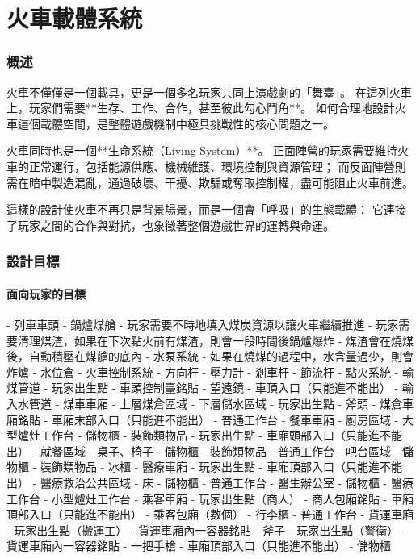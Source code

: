 \section{火車載體系統}
\subsubsection{概述}
火車不僅僅是一個載具，更是一個多名玩家共同上演戲劇的「舞臺」。
在這列火車上，玩家們需要**生存、工作、合作，甚至彼此勾心鬥角**。
如何合理地設計火車這個載體空間，是整體遊戲機制中極具挑戰性的核心問題之一。

火車同時也是一個**生命系統（Living System）**。
正面陣營的玩家需要維持火車的正常運行，包括能源供應、機械維護、環境控制與資源管理；
而反面陣營則需在暗中製造混亂，通過破壞、干擾、欺騙或奪取控制權，盡可能阻止火車前進。

這樣的設計使火車不再只是背景場景，而是一個會「呼吸」的生態載體：
它連接了玩家之間的合作與對抗，也象徵著整個遊戲世界的運轉與命運。

\subsubsection{設計目標}
\paragraph{\Large\bfseries 面向玩家的目標}
\begin{markdown}
- 列車車頭
    - 鍋爐煤艙
        - 玩家需要不時地填入煤炭資源以讓火車繼續推進
        - 玩家需要清理煤渣，如果在下次點火前有煤渣，則會一段時間後鍋爐爆炸
        - 煤渣會在燒煤後，自動積壓在煤艙的底內
    - 水泵系統
        - 如果在燒煤的過程中，水含量過少，則會炸爐
        - 水位倉
    - 火車控制系統
        - 方向杆
        - 壓力計
        - 剎車杆
        - 節流杆
        - 點火系統
    - 輸煤管道
    - 玩家出生點
        - 車頭控制臺銘貼
        - 望遠鏡
        - 車頂入口（只能進不能出）
    - 輸入水管道
- 煤車車廂
  - 上層煤倉區域
  - 下層儲水區域
  - 玩家出生點
    - 斧頭
    - 煤倉車廂銘貼
  - 車廂末部入口（只能進不能出）
  - 普通工作台
- 餐車車廂
  - 廚房區域
    - 大型爐灶工作台
    - 儲物櫃
    - 裝飾類物品
    - 玩家出生點
    - 車廂頭部入口（只能進不能出）
  - 就餐區域
    - 桌子、椅子
    - 儲物櫃
    - 裝飾類物品
    - 普通工作台
  - 吧台區域
    - 儲物櫃
    - 裝飾類物品
    - 冰櫃
- 醫療車廂
  - 玩家出生點
  - 車廂頂部入口（只能進不能出）
  - 醫療救治公共區域
    - 床
    - 儲物櫃
    - 普通工作台
  - 醫生辦公室
    - 儲物櫃
    - 醫療工作台
    - 小型爐灶工作台
- 乘客車廂
  - 玩家出生點（商人）
    - 商人包廂銘貼
    - 車廂頂部入口（只能進不能出）
  - 乘客包廂（數個）
    - 行李櫃
    - 普通工作台
- 貨運車廂
  - 玩家出生點（搬運工）
    - 貨運車廂內一容器銘貼
    - 斧子
  - 玩家出生點（警衛）
    - 貨運車廂內一容器銘貼
    - 一把手槍
  - 車廂頂部入口（只能進不能出）
  - 儲物櫃
\end{markdown}
